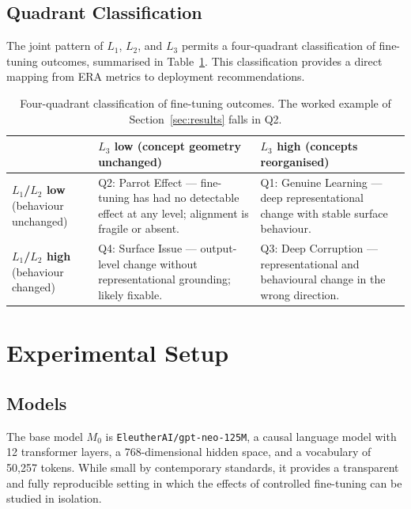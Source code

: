 \documentclass[11pt,a4paper]{article}
\begin{document}
\subsection{Quadrant Classification}

The joint pattern of $L_1$, $L_2$, and $L_3$ permits a four-quadrant classification of
fine-tuning outcomes, summarised in Table~\ref{tab:quadrants}. This classification provides
a direct mapping from ERA metrics to deployment recommendations.

\begin{table}[h]
\centering
\caption{Four-quadrant classification of fine-tuning outcomes. The worked example of
Section~\ref{sec:results} falls in Q2.}
\label{tab:quadrants}
\renewcommand{\arraystretch}{1.4}
\begin{tabularx}{\textwidth}{lXX}
\toprule
 & \textbf{$L_3$ low} (concept geometry unchanged) & \textbf{$L_3$ high} (concepts reorganised) \\
\midrule
\textbf{$L_1$/$L_2$ low} (behaviour unchanged)
  & Q2: Parrot Effect — fine-tuning has had no detectable effect at any level; alignment is fragile or absent.
  & Q1: Genuine Learning — deep representational change with stable surface behaviour. \\
\textbf{$L_1$/$L_2$ high} (behaviour changed)
  & Q4: Surface Issue — output-level change without representational grounding; likely fixable.
  & Q3: Deep Corruption — representational and behavioural change in the wrong direction. \\
\bottomrule
\end{tabularx}
\end{table}

\section{Experimental Setup}
\label{sec:setup}

\subsection{Models}

The base model $M_0$ is \texttt{EleutherAI/gpt-neo-125M}, a causal language model with
12 transformer layers, a 768-dimensional hidden space, and a vocabulary of 50,257 tokens.
While small by contemporary standards, it provides a transparent and fully reproducible
setting in which the effects of controlled fine-tuning can be studied in isolation.
\end{document}
